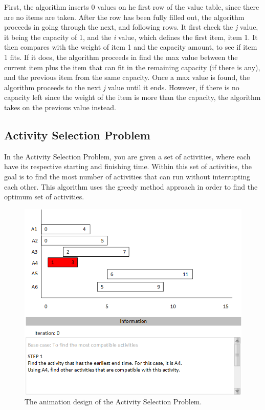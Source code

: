First, the algorithm inserts 0 values on he first row of the value table, since there are no items are taken. After the row has been fully filled out, the algorithm proceeds in going through the next, and following rows. It first check the \textit{j} value, it being the capacity of 1, and the \textit{i} value, which defines the first item, item 1. It then compares with the weight of item 1 and the capacity amount, to see if item 1 fits. If it does, the algorithm proceeds in find the max value between the current item plus the item that can fit in the remaining capacity (if there is any), and the previous item from the same capacity. Once a max value is found, the algorithm proceeds to the next \textit{j} value until it ends. However, if there is no capacity left since the weight of the item is more than the capacity, the algorithm takes on the previous value instead.

\subsection{Activity Selection Problem}

In the Activity Selection Problem, you are given a set of activities, where each have its respective starting and finishing time. Within this set of activities, the goal is to find the most number of activities that can run without interrupting each other. This algorithm uses the greedy method approach in order to find the optimum set of activities. 

\begin{figure}[H]
\centering
\includegraphics[scale=0.9]{images/report_images/animationDesignActivitySelectionProblem_STEP1.png}
\caption{The animation design of the Activity Selection Problem.}
\label{animationDesignActivitySelectionProblem}
\end{figure}

